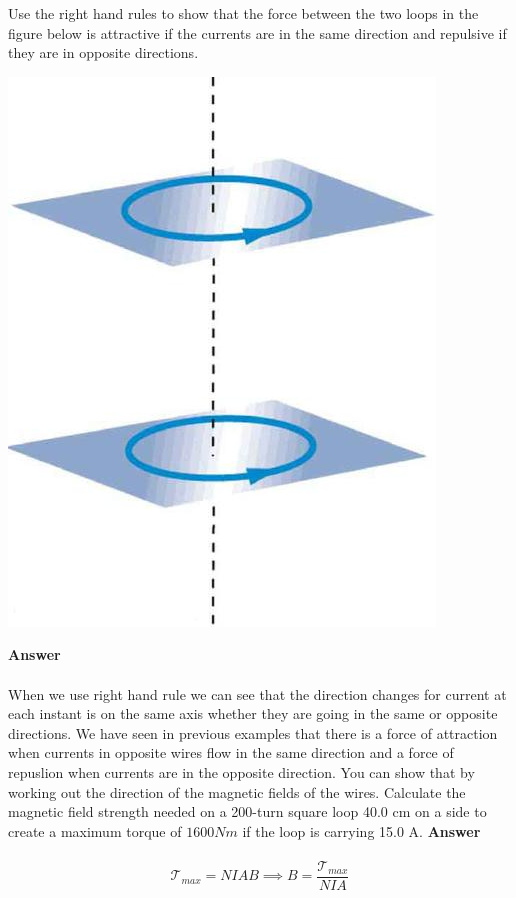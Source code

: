 \documentclass[9pt,addpoints]{exam}
\begin{document}
	\begin{questions}
		\question Use the right hand rules to show that the force between the two loops in the figure below is attractive if the currents are in the same direction and repulsive if they are in opposite directions.
		\begin{center}
			\includegraphics[scale=0.2]{loops}
		\end{center}
		\textbf{Answer} \\ \\
		When we use right hand rule we can see that the direction changes for current at each instant is on the same axis whether they are going in the same or opposite directions. We have seen in previous examples that there is a force of attraction when currents in opposite wires flow in the same direction and a force of repuslion when currents are in the opposite direction. You can show that by working out the direction of the magnetic fields of the wires.
		\question Calculate the magnetic field strength needed on a 200-turn square loop 40.0 cm on a side to create a maximum torque of $1600Nm$ if the loop is carrying 15.0 A.
		\textbf{Answer} \\ \\
		$$\mathcal{T}_{max}=NIAB\implies B=\dfrac{\mathcal{T}_{max}}{NIA}$$

\end{questions}
\end{document}
